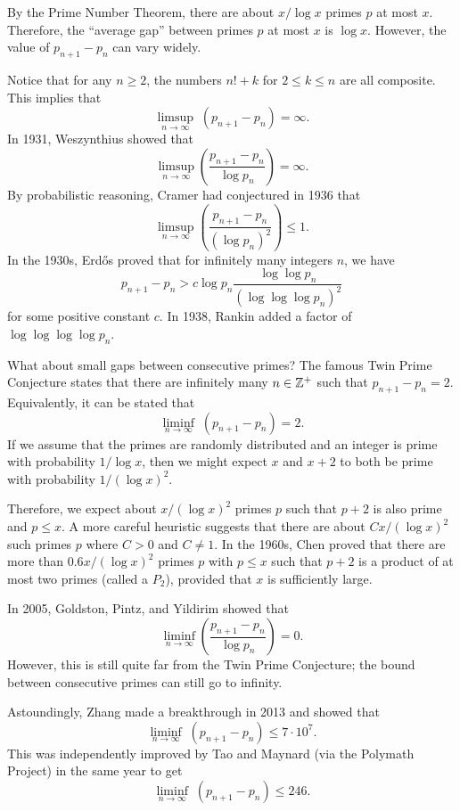 By the Prime Number Theorem, there are about $x/\log x$ primes $p$ at most $x$. Therefore, the 
``average gap'' between primes $p$ at most $x$ is $\log x$. However, the value of $p_{n+1} - p_n$ 
can vary widely. 

Notice that for any $n \geq 2$, the numbers $n! + k$ for $2 \leq k \leq n$ are all composite. This 
implies that 
\[ \limsup_{n\to\infty} \;(p_{n+1} - p_n) = \infty. \]
In 1931, Weszynthius showed that 
\[ \limsup_{n\to\infty} \left( \frac{p_{n+1} - p_n}{\log p_n} \right) = \infty. \]
By probabilistic reasoning, Cramer had conjectured in 1936 that 
\[ \limsup_{n\to\infty} \left( \frac{p_{n+1} - p_n}{(\log p_n)^2} \right) \leq 1. \]
In the 1930s, Erd\H{o}s proved that for infinitely many integers $n$, we have 
\[ p_{n+1} - p_n > c \log p_n \frac{\log\log p_n}{(\log\log\log p_n)^2} \]
for some positive constant $c$. In 1938, Rankin added a factor of $\log\log\log\log p_n$. 

What about small gaps between consecutive primes? The famous Twin Prime Conjecture states that 
there are infinitely many $n \in \mathbb{Z}^+$ such that $p_{n+1} - p_n = 2$. Equivalently, it can be stated that
\[ \liminf_{n\to\infty} \; (p_{n+1} - p_n) = 2. \]
If we assume that the primes are randomly distributed and an integer is prime with 
probability $1/\log x$, then we might expect $x$ and $x+2$ to both be prime with probability 
$1/(\log x)^2$. 

Therefore, we expect about $x/(\log x)^2$ primes $p$ such that $p+2$ is also prime and $p \leq x$. 
A more careful heuristic suggests that there are about $C x/(\log x)^2$ such primes $p$ where 
$C > 0$ and $C \neq 1$. In the 1960s, Chen proved that there are more than $0.6x/(\log x)^2$ 
primes $p$ with $p \leq x$ such that $p+2$ is a product of at most two primes (called a $P_2$), 
provided that $x$ is sufficiently large. 

In 2005, Goldston, Pintz, and Yildirim showed that 
\[ \liminf_{n\to\infty} \left( \frac{p_{n+1} - p_n}{\log p_n} \right) = 0. \]
However, this is still quite far from the Twin Prime Conjecture; the bound between consecutive primes 
can still go to infinity. 

Astoundingly, Zhang made a breakthrough in 2013 and showed that 
\[ \liminf_{n\to\infty} \; (p_{n+1} - p_n) \leq 7 \cdot 10^7. \]
This was independently improved by Tao and Maynard (via the Polymath Project) in the same year to get 
\[ \liminf_{n\to\infty} \; (p_{n+1} - p_n) \leq 246. \]